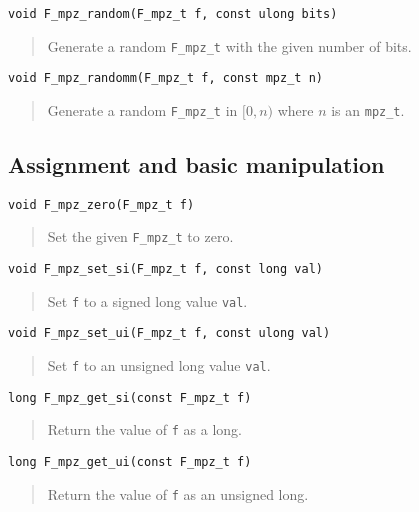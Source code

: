 \documentclass[a4paper,10pt]{article}
\newcommand{\code}{\lstinline}
\begin{document}
\begin{lstlisting}
void F_mpz_random(F_mpz_t f, const ulong bits)
\end{lstlisting}
\begin{quote}
Generate a random \code{F_mpz_t} with the given number of bits.
\end{quote}

\begin{lstlisting}
void F_mpz_randomm(F_mpz_t f, const mpz_t n)
\end{lstlisting}
\begin{quote}
Generate a random \code{F_mpz_t} in $[0, n)$ where $n$ is an \code{mpz_t}.
\end{quote}

\subsection{Assignment and basic manipulation}

\begin{lstlisting}
void F_mpz_zero(F_mpz_t f)
\end{lstlisting}
\begin{quote}
Set the given \code{F_mpz_t} to zero.
\end{quote}

\begin{lstlisting}
void F_mpz_set_si(F_mpz_t f, const long val)
\end{lstlisting}
\begin{quote}
Set \code{f} to a signed long value \code{val}.
\end{quote}

\begin{lstlisting}
void F_mpz_set_ui(F_mpz_t f, const ulong val)
\end{lstlisting}
\begin{quote}
Set \code{f} to an unsigned long value \code{val}.
\end{quote}

\begin{lstlisting}
long F_mpz_get_si(const F_mpz_t f)
\end{lstlisting}
\begin{quote}
Return the value of \code{f} as a long.
\end{quote}

\begin{lstlisting}
long F_mpz_get_ui(const F_mpz_t f)
\end{lstlisting}
\begin{quote}
Return the value of \code{f} as an unsigned long.
\end{quote}
\end{document}
